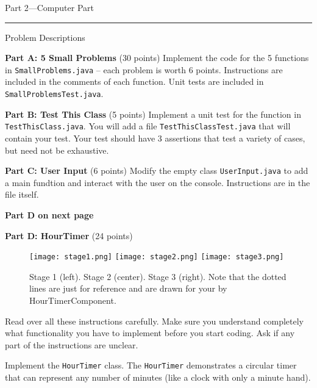 \documentclass[12pt,twoside]{article}
\newcommand{\code}[1]{\texttt{#1}}
\begin{document}
\clearpage
{\Large Part 2---Computer Part}

\vspace{0.25in}
\hrule
{\large Problem Descriptions}

\textbf{Part A: 5 Small Problems} (30 points) Implement the code for the 5 functions in \code{SmallProblems.java} -- each problem is worth 6 points.  Instructions are included in the comments of each function.  Unit tests are included in \code{SmallProblemsTest.java}.

\vspace{0.15in}

\textbf{Part B: Test This Class} (5 points) Implement a unit test for the function in \code{TestThisClass.java}.  You will add a file \code{TestThisClassTest.java} that will contain your test.  Your test should have 3 assertions that test a variety of cases, but need not be exhaustive.

\vspace{0.15in}

\textbf{Part C: User Input} (6 points) Modify the empty class \code{UserInput.java} to add a main fundtion and interact with the user on the console.  Instructions are in the file itself.

\vspace{0.15in}

\textbf{Part D on next page}

\clearpage

\textbf{Part D: HourTimer} (24 points) 

\begin{figure}
	\begin{center}
		\texttt{[image: stage1.png]}
		\texttt{[image: stage2.png]}
		\texttt{[image: stage3.png]}
	\end{center}
	\caption*{Stage 1 (left). Stage 2 (center). Stage 3 (right).
Note that the dotted lines are just for reference and are drawn for your by HourTimerComponent.}
	\label{fig:one}
\end{figure}


Read over all these instructions carefully.  Make sure you understand completely what functionality you have to implement before you start coding.  Ask if any part of the instructions are unclear.

Implement the \code{HourTimer} class.  The \code{HourTimer} demonstrates a circular timer that can represent any number of minutes (like a clock with only a minute hand).
\end{document}
